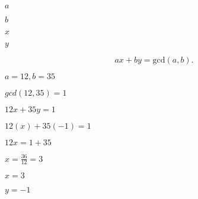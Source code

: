 \documentclass[10pt]{book}
\begin{document}
\begin{mdSnippets}
\begin{mdInlineSnippet}[0cc175b9c0f1b6a831c399e269772661]%
$a$\end{mdInlineSnippet}%
\begin{mdInlineSnippet}%
$b$\end{mdInlineSnippet}%
\begin{mdInlineSnippet}[9dd4e461268c8034f5c8564e155c67a6]%
$x$\end{mdInlineSnippet}%
\begin{mdInlineSnippet}[415290769594460e2e485922904f345d]%
$y$\end{mdInlineSnippet}%
\begin{mdDisplaySnippet}[4c68596fb6576002efdf90b69e3829d8]%
\[%
ax+by=\mathrm{gcd}(a,b).
\]%
\end{mdDisplaySnippet}%
\begin{mdInlineSnippet}[8c5f55735e195b1319bb133ba79cc21b]%
$a=12, b=35$\end{mdInlineSnippet}%
\begin{mdInlineSnippet}[5827672d2d9e74fef8809339059eb394]%
$gcd(12,35) = 1$\end{mdInlineSnippet}%
\begin{mdInlineSnippet}[792072dbebdabb7282ec5bb286a5d513]%
$12x + 35y = 1$\end{mdInlineSnippet}%
\begin{mdInlineSnippet}[c39d782af91ec525fbc671558896a15e]%
$12(x) + 35(-1) = 1$\end{mdInlineSnippet}%
\begin{mdInlineSnippet}[b3cc3e9dcccdafafd2c413c34020f642]%
$12x = 1+35$\end{mdInlineSnippet}%
\begin{mdInlineSnippet}[686a3efc371c67c29f7031818b460c95]%
$x = \frac{36} {12} = 3$\end{mdInlineSnippet}%
\begin{mdInlineSnippet}[4c63f2fd29fec6c20010a36949e9752d]%
$x = 3$\end{mdInlineSnippet}%
\begin{mdInlineSnippet}[e1b3791d0f771fc82c4e5db3a0744fc4]%
$y = -1$\end{mdInlineSnippet}%

\end{mdSnippets}
\end{document}
